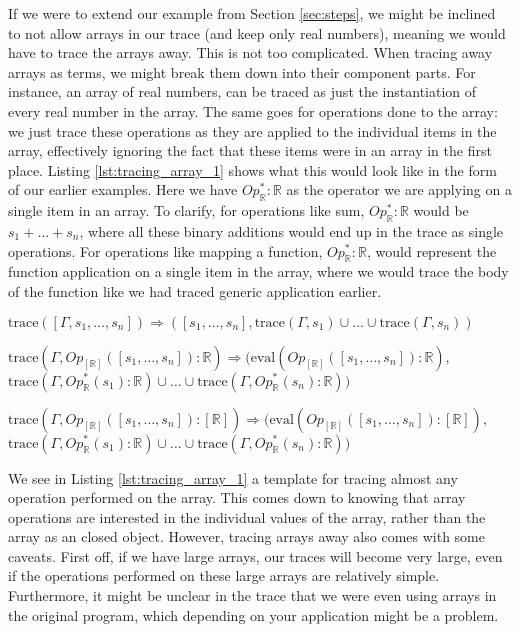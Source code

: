         If we were to extend our example from Section \ref{sec:steps}, we might be inclined to not allow arrays in our trace (and keep only real numbers), meaning we would have to trace the arrays away.
        This is not too complicated.
        When tracing away arrays as terms, we might break them down into their component parts.
        For instance, an array of real numbers, can be traced as just the instantiation of every real number in the array.
        The same goes for operations done to the array: we just trace these operations as they are applied to the individual items in the array, effectively ignoring the fact that these items were in an array in the first place.
        Listing \ref{lst:tracing_array_1} shows what this would look like in the form of our earlier examples.
        Here we have $Op^*_\mathbb{R}:\mathbb{R}$ as the operator we are applying on a single item in an array.
        To clarify, for operations like sum, $Op^*_\mathbb{R}:\mathbb{R}$ would be $s_1+\dots+s_n$, where all these binary additions would end up in the trace as single operations.
        For operations like mapping a function, $Op^*_\mathbb{R}:\mathbb{R}$, would represent the function application on a single item in the array, where we would trace the body of the function like we had traced generic application earlier.

        \begin{quicklst}[caption=Tracing away arrays, label=lst:tracing_array_1, gobble=12]
            $\text{trace}([\Gamma,s_1,\dots,s_n])\Rightarrow([s_1,\dots,s_n],\text{trace}(\Gamma,s_1)\cup\dots\cup\text{trace}(\Gamma,s_n))$

            $\text{trace}(\Gamma,Op_{[\mathbb{R}]}([s_1,\dots,s_n]):\mathbb{R})\Rightarrow(\text{eval}(Op_{[\mathbb{R}]}([s_1,\dots,s_n]):\mathbb{R}),$
                $\text{trace}(\Gamma,Op^*_\mathbb{R}(s_1):\mathbb{R})\cup\dots\cup\text{trace}(\Gamma,Op^*_\mathbb{R}(s_n):\mathbb{R}))$

            $\text{trace}(\Gamma,Op_{[\mathbb{R}]}([s_1,\dots,s_n]):[\mathbb{R}])\Rightarrow(\text{eval}(Op_{[\mathbb{R}]}([s_1,\dots,s_n]):[\mathbb{R}]),$
                $\text{trace}(\Gamma,Op^*_\mathbb{R}(s_1):\mathbb{R})\cup\dots\cup\text{trace}(\Gamma,Op^*_\mathbb{R}(s_n):\mathbb{R}))$
        \end{quicklst}

        We see in Listing \ref{lst:tracing_array_1} a template for tracing almost any operation performed on the array.
        This comes down to knowing that array operations are interested in the individual values of the array, rather than the array as an closed object.
        However, tracing arrays away also comes with some caveats.
        First off, if we have large arrays, our traces will become very large, even if the operations performed on these large arrays are relatively simple.
        Furthermore, it might be unclear in the trace that we were even using arrays in the original program, which depending on your application might be a problem.

